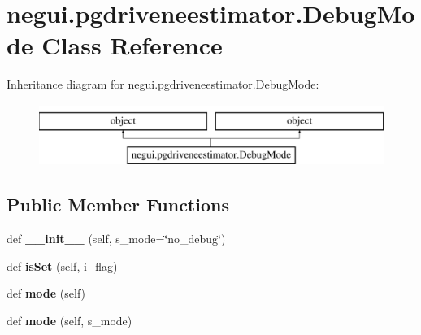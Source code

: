 \hypertarget{classnegui_1_1pgdriveneestimator_1_1DebugMode}{}\section{negui.\+pgdriveneestimator.\+Debug\+Mode Class Reference}
\label{classnegui_1_1pgdriveneestimator_1_1DebugMode}
Inheritance diagram for negui.\+pgdriveneestimator.\+Debug\+Mode\+:\begin{figure}[H]
\begin{center}
\leavevmode
\includegraphics[height=2.000000cm]{classnegui_1_1pgdriveneestimator_1_1DebugMode}
\end{center}
\end{figure}
\subsection*{Public Member Functions}
\begin{DoxyCompactItemize}
\item 
def {\bfseries \+\_\+\+\_\+init\+\_\+\+\_\+} (self, s\+\_\+mode=\char`\"{}no\+\_\+debug\char`\"{})\hypertarget{classnegui_1_1pgdriveneestimator_1_1DebugMode_ad28ea39a3d3a4163f408348fbcdf8207}{}\label{classnegui_1_1pgdriveneestimator_1_1DebugMode_ad28ea39a3d3a4163f408348fbcdf8207}

\item 
def {\bfseries is\+Set} (self, i\+\_\+flag)\hypertarget{classnegui_1_1pgdriveneestimator_1_1DebugMode_ab345367b1debb52518dd753b4c740d3c}{}\label{classnegui_1_1pgdriveneestimator_1_1DebugMode_ab345367b1debb52518dd753b4c740d3c}

\item 
def {\bfseries mode} (self)\hypertarget{classnegui_1_1pgdriveneestimator_1_1DebugMode_a877126bd7e0e8a571b90e0be7436568b}{}\label{classnegui_1_1pgdriveneestimator_1_1DebugMode_a877126bd7e0e8a571b90e0be7436568b}

\item 
def {\bfseries mode} (self, s\+\_\+mode)\hypertarget{classnegui_1_1pgdriveneestimator_1_1DebugMode_ae3f4deed085cffa67a10aa94f857ade0}{}\label{classnegui_1_1pgdriveneestimator_1_1DebugMode_ae3f4deed085cffa67a10aa94f857ade0}

\end{DoxyCompactItemize}
